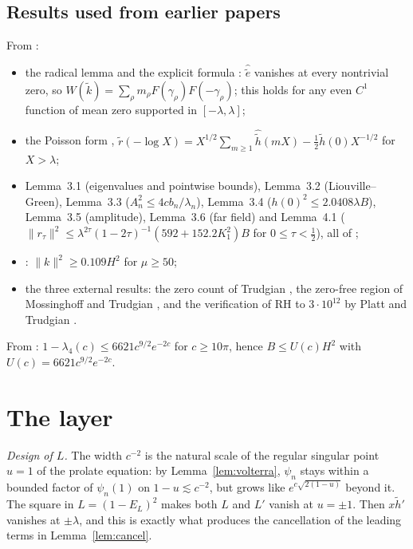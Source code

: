\documentclass[11pt]{amsart}
\theoremstyle{remark}
\numberwithin{equation}{section}
\begin{document}
\subsection{Results used from earlier papers}
From \cite{MoriWeilII}:
\begin{itemize}
\item the radical lemma \cite[Lemma~2.2]{MoriWeilII} and the explicit formula \cite[(2.1)]{MoriWeilII}: $\hat{\tilde e}$ vanishes at every nontrivial zero, so $W(\tilde k)=\sum_\rho m_\rho F(\gamma_\rho)F(-\gamma_\rho)$; this holds for any even $C^1$ function of mean zero supported in $[-\lambda,\lambda]$;
\item the Poisson form \cite[Lemma~2.3]{MoriWeilII}, $\tilde r(-\log X)=X^{1/2}\sum_{m\ge1}\hat{\tilde h}(mX)-\frac12\tilde h(0)X^{-1/2}$ for $X>\lambda$;
\item Lemma~3.1 (eigenvalues and pointwise bounds), Lemma~3.2 (Liouville--Green), Lemma~3.3 ($A_n^2\le4cb_n/\lambda_n$), Lemma~3.4 ($h(0)^2\le2.0408\lambda B$), Lemma~3.5 (amplitude), Lemma~3.6 (far field) and Lemma~4.1 ($\|r_\tau\|^2\le\lambda^{2\tau}(1-2\tau)^{-1}(592+152.2K_1^2)B$ for $0\le\tau<\frac12$), all of \cite{MoriWeilII};
\item \cite[Thm.~D]{MoriWeilII}: $\|k\|^2\ge0.109H^2$ for $\mu\ge50$;
\item the three external results: the zero count of Trudgian \cite{Trudgian14}, the zero-free region of Mossinghoff and Trudgian \cite{MT15}, and the verification of RH to $3\cdot10^{12}$ by Platt and Trudgian \cite{PT21}.
\end{itemize}
From \cite{MoriPSWF}: $1-\lambda_4(c)\le6621c^{9/2}e^{-2c}$ for $c\ge10\pi$, hence $B\le U(c)H^2$ with $U(c)=6621c^{9/2}e^{-2c}$.

\section{The layer}\label{sec:layer}

\emph{Design of $L$.} The width $c^{-2}$ is the natural scale of the regular singular point $u=1$ of the prolate equation: by Lemma~\ref{lem:volterra}, $\psi_n$ stays within a bounded factor of $\psi_n(1)$ on $1-u\lesssim c^{-2}$, but grows like $e^{c\sqrt{2(1-u)}}$ beyond it. The square in $L=(1-E_L)^2$ makes both $L$ and $L'$ vanish at $u=\pm1$. Then $x\tilde h'$ vanishes at $\pm\lambda$, and this is exactly what produces the cancellation of the leading terms in Lemma~\ref{lem:cancel}.
\end{document}
